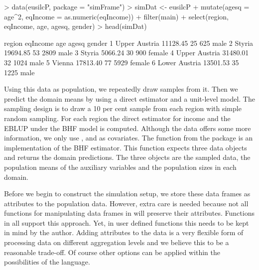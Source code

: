 \documentclass[article]{ajs}
\newcommand{\red}[1]{\color{red} #1 \color{black} }
\begin{document}
\begin{Schunk}
\begin{Sinput}
> data(eusilcP, package = "simFrame")
> simDat <- eusilcP %
+   mutate(agesq = age^2, eqIncome = as.numeric(eqIncome)) %
+   filter(main) %
+   select(region, eqIncome, age, agesq, gender)
> head(simDat)
\end{Sinput}
\begin{Soutput}
         region eqIncome age agesq gender
1 Upper Austria 11128.45  25   625   male
2        Styria 19694.85  53  2809   male
3        Styria  5066.24  30   900 female
4 Upper Austria 31480.01  32  1024   male
5        Vienna 17813.40  77  5929 female
6 Lower Austria 13501.53  35  1225   male
\end{Soutput}
\end{Schunk}

Using this data as population, we repeatedly draw samples from it. Then we predict the domain means by using a direct estimator and a unit-level model. The sampling design is to draw a 10 per cent sample from each region with simple random sampling. For each region the direct estimator for income and the EBLUP under the BHF model is computed. Although the data offers some more information, we only use ,  and  as covariates. The function  from the package  is an implementation of the BHF estimator. This function expects three data objects and returns \red{the} domain predictions. The three objects are the sampled data, the population means of the auxiliary variables and the population sizes in each domain. 

\red{Before we begin to construct the simulation setup, we store these data frames as attributes to the population data. However, extra care is needed because not all functions for manipulating data frames in \proglang{R} will preserve their attributes. Functions in \proglang{saeSim} all support this approach. Yet, in user defined functions this needs to be kept in mind by the author. Adding attributes to the data is a very flexible form of processing data on different aggregation levels and we believe this to be a reasonable trade-off. Of course other options can be applied within the possibilities of the \proglang{R} language.}
\end{document}
